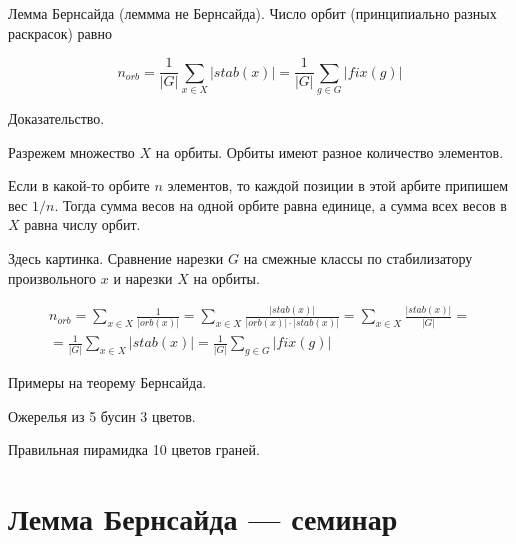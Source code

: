 \documentclass[12pt]{article} %
\begin{document}
Лемма Бернсайда (леммма не Бернсайда). Число орбит (принципиально разных раскрасок) равно

\[
n_{orb} = \frac{1}{|G|} \sum_{x\in X} |stab(x)| = \frac{1}{|G|} \sum_{g\in G} |fix(g)|
\]


Доказательство.

Разрежем множество $X$ на орбиты. Орбиты имеют разное количество элементов.

Если в какой-то орбите $n$ элементов, то каждой позиции в этой арбите припишем вес $1/n$. Тогда сумма весов на одной орбите равна единице, а сумма всех весов в $X$ равна числу орбит.

Здесь картинка. Сравнение нарезки $G$ на смежные классы по стабилизатору произвольного $x$ и нарезки $X$ на орбиты.

\begin{multline}
n_{orb} = \sum_{x \in X} \frac{1}{|orb(x)|} = \sum_{x \in X} \frac{|stab(x)|}{|orb(x)|\cdot |stab(x)|} = \sum_{x \in X} \frac{|stab(x)|}{|G|} = \\
= \frac{1}{|G|} \sum_{x\in X} |stab(x)| = \frac{1}{|G|} \sum_{g\in G} |fix(g)|
\end{multline}

Примеры на теорему Бернсайда.

Ожерелья из 5 бусин 3 цветов.

Правильная пирамидка 10 цветов граней.

\newpage
\section{Лемма Бернсайда — семинар}
\end{document}
